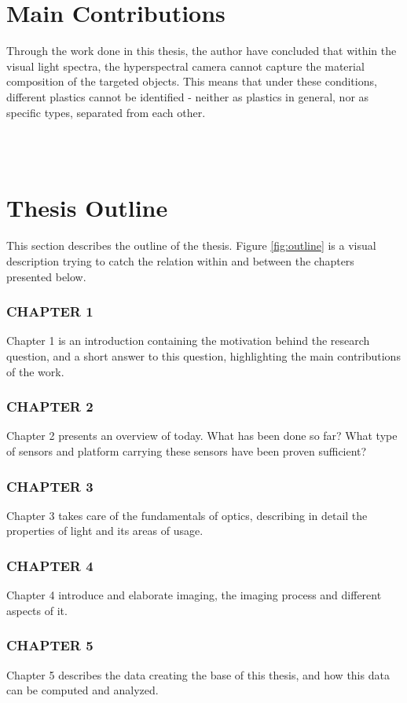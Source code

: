 \section{Main Contributions}
Through the work done in this thesis, the author have concluded that within the visual light spectra, the hyperspectral camera cannot capture the material composition of the targeted objects. This means that under these conditions, different plastics cannot be identified - neither as plastics in general, nor as specific types, separated from each other.

\\\\
\section{Thesis Outline}
This section describes the outline of the thesis. Figure \ref{fig:outline} is a visual description trying to catch the relation within and between the chapters presented below. 
\subsubsection*{CHAPTER 1} Chapter 1 is an introduction containing the motivation behind the research question, and a short answer to this question, highlighting the main contributions of the work. 
\subsubsection*{CHAPTER 2} Chapter 2 presents an overview of today. What has been done so far? What type of sensors and platform carrying these sensors have been proven sufficient?
\subsubsection*{CHAPTER 3} Chapter 3 takes care of the fundamentals of optics, describing in detail the properties of light and its areas of usage.
\subsubsection*{CHAPTER 4} Chapter 4 introduce and elaborate imaging, the imaging process and different aspects of it.
\subsubsection*{CHAPTER 5} Chapter 5 describes the data creating the base of this thesis, and how this data can be computed and analyzed.
